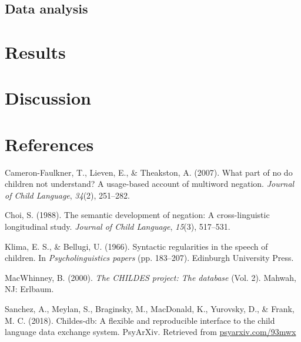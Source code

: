 \documentclass[man,floatsintext,draftall]{apa6}
\begin{document}
\hypertarget{data-analysis}{%
\subsection{Data analysis}\label{data-analysis}}

\hypertarget{results-1}{%
\section{Results}\label{results-1}}

\hypertarget{discussion}{%
\section{Discussion}\label{discussion}}

\newpage

\hypertarget{references}{%
\section{References}\label{references}}

\begingroup
\setlength{\parindent}{-0.5in}
\setlength{\leftskip}{0.5in}

\endgroup

\hypertarget{refs}{}
\leavevmode\hypertarget{ref-cameron2007part}{}%
Cameron-Faulkner, T., Lieven, E., \& Theakston, A. (2007). What part of no do children not understand? A usage-based account of multiword negation. \emph{Journal of Child Language}, \emph{34}(2), 251--282.

\leavevmode\hypertarget{ref-choi1988semantic}{}%
Choi, S. (1988). The semantic development of negation: A cross-linguistic longitudinal study. \emph{Journal of Child Language}, \emph{15}(3), 517--531.

\leavevmode\hypertarget{ref-klimaBellugi1966}{}%
Klima, E. S., \& Bellugi, U. (1966). Syntactic regularities in the speech of children. In \emph{Psycholinguistics papers} (pp. 183--207). Edinburgh University Press.

\leavevmode\hypertarget{ref-macwhinney2000childes}{}%
MacWhinney, B. (2000). \emph{The CHILDES project: The database} (Vol. 2). Mahwah, NJ: Erlbaum.

\leavevmode\hypertarget{ref-sanchez2018childes}{}%
Sanchez, A., Meylan, S., Braginsky, M., MacDonald, K., Yurovsky, D., \& Frank, M. C. (2018). Childes-db: A flexible and reproducible interface to the child language data exchange system. PsyArXiv. Retrieved from \url{psyarxiv.com/93mwx}
\end{document}
